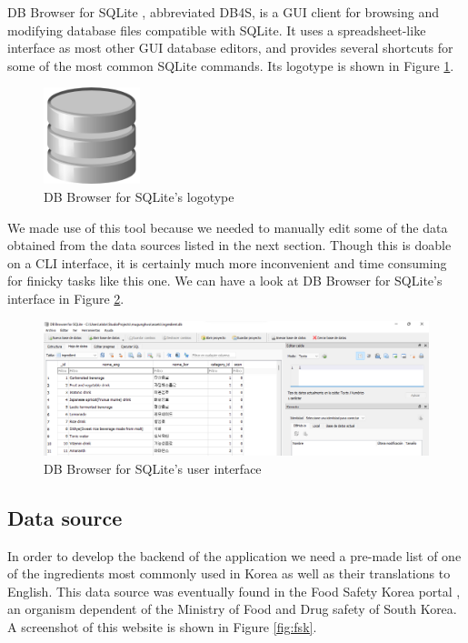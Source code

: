DB Browser for SQLite \cite{noauthor_db_nodate}, abbreviated DB4S, is a GUI client for browsing and modifying database files compatible with SQLite. It uses a spreadsheet-like interface as most other GUI database editors, and provides several shortcuts for some of the most common SQLite commands. Its logotype is shown in Figure \ref{fig:db4s}.

\begin{figure}[h]
  \centering
  \includegraphics[width=0.25\textwidth]{Figures/db4s.png}
  \caption{%
    DB Browser for SQLite's logotype
  }
  \label{fig:db4s}
\end{figure}

We made use of this tool because we needed to manually edit some of the data obtained from the data sources listed in the next section. Though this is doable on a CLI interface, it is certainly much more inconvenient and time consuming for finicky tasks like this one. We can have a look at DB Browser for SQLite's interface in Figure \ref{fig:db4s-screen}.

\begin{figure}[h]
  \centering
  \includegraphics[width=\textwidth]{Figures/db4s-screen.png}
  \caption{%
    DB Browser for SQLite's user interface
  }
  \label{fig:db4s-screen}
\end{figure}

\subsection{Data source}

In order to develop the backend of the application we need a pre-made list of one of the ingredients most commonly used in Korea as well as their translations to English. This data source was eventually found in the Food Safety Korea portal \cite{noauthor__nodate-1}, an organism dependent of the Ministry of Food and Drug safety of South Korea. A screenshot of this website is shown in Figure \ref{fig:fsk}.

